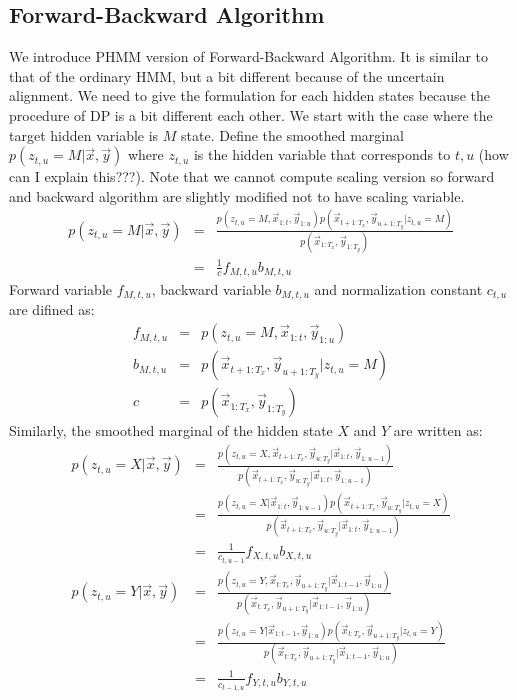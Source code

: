 \subsection{Forward-Backward Algorithm}
We introduce PHMM version of Forward-Backward Algorithm. 
It is similar to that of the ordinary HMM, but a bit different because of the uncertain alignment. 
We need to give the formulation for each hidden states because the procedure of DP is a bit different each other.
We start with the case where the target hidden variable is $M$ state. 
Define the smoothed marginal $p(z_{t, u} = M | \vec{x}, \vec{y})$ where $z_{t, u}$ is the hidden variable that corresponds to $t, u$ (how can I explain this???). Note that we cannot compute scaling version so forward and backward algorithm are slightly modified not to have scaling variable.
\begin{eqnarray}
  p(z_{t,u} = M | \vec{x}, \vec{y}) 
                            &=& \frac{ p(z_{t, u}=M , \vec{x}_{1:t}, \vec{y}_{1:u}) p(\vec{x}_{t+1:T_x}, \vec{y}_{u+1:T_y} | z_{t, u}= M) } {p(\vec{x}_{1:T_x}, \vec{y}_{1:T_y})} \nonumber \\
                            &=& \frac{1}{c} f_{M, t, u} b_{M, t, u}
\end{eqnarray}
Forward variable $f_{M, t, u}$, backward variable $b_{M, t, u}$ and normalization constant $c_{t, u}$ are difined as:
\begin{eqnarray}
  f_{M, t, u} &=& p(z_{t, u}=M , \vec{x}_{1:t}, \vec{y}_{1:u}) \\
  b_{M, t, u} &=& p(\vec{x}_{t+1:T_x}, \vec{y}_{u+1:T_y} | z_{t, u}= M) \\
  c    &=& p(\vec{x}_{1:T_x}, \vec{y}_{1:T_y})
\end{eqnarray}
Similarly, the smoothed marginal of the hidden state $X$ and $Y$ are written as:
\begin{eqnarray}
p(z_{t,u} = X | \vec{x}, \vec{y}) &=& \frac{ p(z_{t, u}=X, \vec{x}_{t+1:T_x}, \vec{y}_{u:T_y}| \vec{x}_{1:t}, \vec{y}_{1:u-1}) } {p(\vec{x}_{t+1:T_x}, \vec{y}_{u:T_y}| \vec{x}_{1:t}, \vec{y}_{1:u-1})} \nonumber\\
                            &=& \frac{ p(z_{t, u}=X | \vec{x}_{1:t}, \vec{y}_{1:u-1}) p(\vec{x}_{t+1:T_x}, \vec{y}_{u:T_y} | z_{t, u}= X) } {p(\vec{x}_{t+1:T_x}, \vec{y}_{u:T_y}| \vec{x}_{1:t}, \vec{y}_{1:u-1})} \nonumber \\
                            &=& \frac{1}{c_{t,u-1}} f_{X, t, u} b_{X, t, u} \\
p(z_{t,u} = Y | \vec{x}, \vec{y}) &=& \frac{ p(z_{t, u}=Y, \vec{x}_{t:T_x}, \vec{y}_{u+1:T_y}| \vec{x}_{1:t-1}, \vec{y}_{1:u}) } {p(\vec{x}_{t:T_x}, \vec{y}_{u+1:T_y}| \vec{x}_{1:t-1}, \vec{y}_{1:u})} \nonumber\\
                            &=& \frac{ p(z_{t, u}=Y | \vec{x}_{1:t-1}, \vec{y}_{1:u}) p(\vec{x}_{t:T_x}, \vec{y}_{u+1:T_y} | z_{t, u}= Y) } {p(\vec{x}_{t:T_x}, \vec{y}_{u+1:T_y}| \vec{x}_{1:t-1}, \vec{y}_{1:u})} \nonumber \\
                            &=& \frac{1}{c_{t-1,u}} f_{Y, t, u} b_{Y, t, u}
\end{eqnarray}
